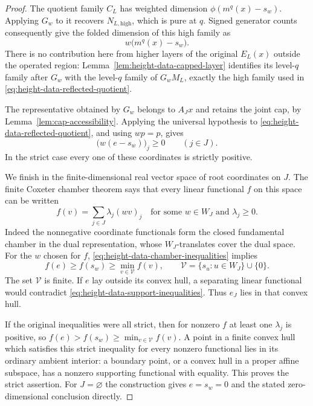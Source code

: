 \begin{proof}
The quotient family $C_L$ has weighted dimension
$\phi(m^q(x)-s_w)$.  Applying $G_w$ to it recovers
$N_{L,\mathrm{high}}$, which is pure at $q$.
Signed generator counts consequently give the folded
dimension of this high family as
\begin{equation}
 w\bigl(m^q(x)-s_w\bigr).
 \label{eq:height-data-reflected-quotient}
\end{equation}
There is no contribution here from higher layers of
the original $E_L(x)$ outside the operated region:
Lemma~\ref{lem:height-data-capped-layer} identifies
its level-$q$ family after $G_w$ with the level-$q$
family of $G_wM_L$, exactly the high family used in
\eqref{eq:height-data-reflected-quotient}.

The representative obtained by $G_w$ belongs to
$A_Jx$ and retains the joint cap, by
Lemma~\ref{lem:cap-accessibility}.  Applying the
universal hypothesis to
\eqref{eq:height-data-reflected-quotient}, and using
$wp=p$, gives
\begin{equation}
 \bigl(w(e-s_w)\bigr)_j\geq0\qquad(j\in J).
 \label{eq:height-data-chamber-inequalities}
\end{equation}
In the strict case every one of these coordinates is
strictly positive.

We finish in the finite-dimensional real vector
space of root coordinates on $J$.  The finite
Coxeter chamber theorem says that every linear
functional $f$ on this space can be written
\[
 f(v)=\sum_{j\in J}\lambda_j(wv)_j
 \quad\text{for some }w\in W_J\text{ and }
 \lambda_j\geq0.
\]
Indeed the nonnegative coordinate functionals form
the closed fundamental chamber in the dual
representation, whose $W_J$-translates cover
the dual space.  For the $w$ chosen for $f$,
\eqref{eq:height-data-chamber-inequalities} implies
\begin{equation}
 f(e)\geq f(s_w)\geq\min_{v\in\mathcal V} f(v),
 \qquad
 \mathcal V=\{s_u:u\in W_J\}\cup\{0\}.
 \label{eq:height-data-support-inequalities}
\end{equation}
The set $\mathcal V$ is finite.  If $e$ lay outside
its convex hull, a separating linear functional
would contradict
\eqref{eq:height-data-support-inequalities}.
Thus $e_J$ lies in that convex hull.

If the original inequalities were all strict, then
for nonzero $f$ at least one $\lambda_j$ is positive,
so $f(e)>f(s_w)\geq\min_{v\in\mathcal V}f(v)$.
A point in a finite convex hull which satisfies
this strict inequality for every nonzero functional
lies in its ordinary ambient interior: a boundary
point, or a convex hull in a proper affine
subspace, has a nonzero supporting functional
with equality.  This proves the strict assertion.
For $J=\varnothing$ the construction gives
$e=s_w=0$ and the stated zero-dimensional conclusion
directly.
\end{proof}
